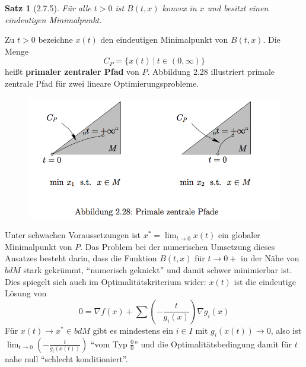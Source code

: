 \documentclass[12pt]{extreport} %
\theoremstyle{named}
\theoremstyle{nnamed}
\theoremstyle{itshape}
\newtheorem*{satz}{Satz}
\theoremstyle{normal}
\begin{document}
\begin{satz}[2.7.5]
	Für alle $t > 0$ ist $B(t, x)$ konvex in $x$ und besitzt einen eindeutigen Minimalpunkt.
\end{satz}

Zu $t > 0$ bezeichne $x(t)$ den eindeutigen Minimalpunkt von $B(t,x)$. Die Menge
	$$ C_P = \big\{ x(t) ~|~t \in (0, \infty) \big\} $$
heißt \textbf{primaler zentraler Pfad} von $P$. Abbildung 2.28 illustriert primale zentrale Pfad für zwei lineare Optimierungsprobleme.

\begin{figure}[h!] \centering
	\includegraphics[scale=0.55]{img/vl-alg-24}
\end{figure}

Unter schwachen Voraussetzungen ist $x^* = \lim_{t \rightarrow 0}x(t)$ ein globaler Minimalpunkt von $P$. Das Problem bei der numerischen Umsetzung dieses Ansatzes besteht darin, dass die Funktion $B(t, x)$ für $t \rightarrow 0+$ in der Nähe von $bdM$ stark gekrümmt, \enquote{numerisch geknickt} und damit schwer minimierbar ist. Dies spiegelt sich auch im Optimalitätskriterium wider: $x(t)$ ist die eindeutige Lösung von
	$$ 0= \nabla f(x) + \sum \left( - \frac{t}{g_i(x)} \right) \nabla g_i(x) $$
Für $x(t) \rightarrow x^* \in bdM$ gibt es mindestens ein $i \in I$ mit $g_i(x(t)) \rightarrow 0$, also ist $\lim_{t \rightarrow 0} \left( - \frac{t}{g_i(x(t))} \right)$ \enquote{vom Typ $\frac{0}{0}$} und die Optimalitätsbedingung damit für $t$ nahe null \enquote{schlecht konditioniert}. ~\bigskip
\end{document}
